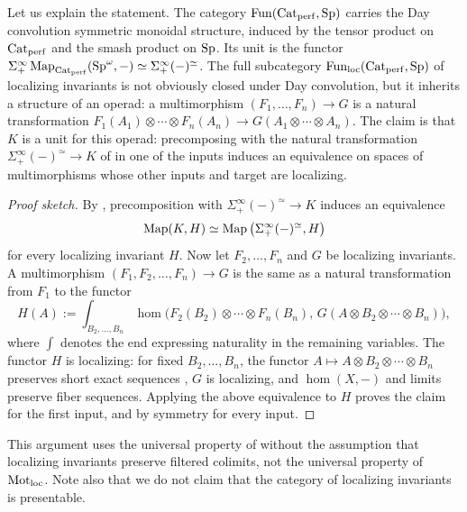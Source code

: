 	Let us explain the statement. The category $\operatorname{Fun}({\textup{Cat}}_{\operatorname{perf}},{\textup{Sp}})$ carries the Day convolution symmetric monoidal structure, induced by the tensor product on ${\textup{Cat}}_{\operatorname{perf}}$ and the smash product on ${\textup{Sp}}$. Its unit is the functor $\Sigma^{\infty}_+\operatorname{Map}_{{\textup{Cat}}_{\operatorname{perf}}}({\textup{Sp}}^{\omega},-) \simeq \Sigma^{\infty}_+(-)^{\simeq}$. The full subcategory $\operatorname{Fun}_{\mathrm{loc}}({\textup{Cat}}_{\operatorname{perf}},{\textup{Sp}})$ of localizing invariants is not obviously closed under Day convolution, but it inherits a structure of an operad: a multimorphism $(F_1,\dots,F_n) \to G$ is a natural transformation $F_1(A_1) \otimes \cdots \otimes F_n(A_n) \to G(A_1 \otimes \cdots \otimes A_n)$. The claim is that $K$ is a unit for this operad: precomposing with the natural transformation $\Sigma^{\infty}_+(-)^{\simeq} \to K$ of  in one of the inputs induces an equivalence on spaces of multimorphisms whose other inputs and target are localizing.

	\begin{proof}[Proof sketch]
		By , precomposition with $\Sigma^{\infty}_+(-)^{\simeq} \to K$ induces an equivalence
		\[
			\operatorname{Map}(K,H) \simeq \operatorname{Map}\big(\Sigma^{\infty}_+(-)^{\simeq},H\big)
		\]
		for every localizing invariant $H$. Now let $F_2,\dots,F_n$ and $G$ be localizing invariants. A multimorphism $(F_1,F_2,\dots,F_n) \to G$ is the same as a natural transformation from $F_1$ to the functor
		\[
			H(A) := \int_{B_2,\dots,B_n} \hom\big(F_2(B_2) \otimes \cdots \otimes F_n(B_n),\, G(A \otimes B_2 \otimes \cdots \otimes B_n)\big),
		\]
		where $\int$ denotes the end expressing naturality in the remaining variables. The functor $H$ is localizing: for fixed $B_2,\dots,B_n$, the functor $A \mapsto A \otimes B_2 \otimes \cdots \otimes B_n$ preserves short exact sequences \cite[before Theorem~5.18]{HSS2017HigherTraces}, $G$ is localizing, and $\hom(X,-)$ and limits preserve fiber sequences. Applying the above equivalence to $H$ proves the claim for the first input, and by symmetry for every input.
	\end{proof}

	This argument uses the universal property of  without the assumption that localizing invariants preserve filtered colimits, not the universal property of $\mathrm{Mot}_{\mathrm{loc}}$. Note also that we do not claim that the category of localizing invariants is presentable.

